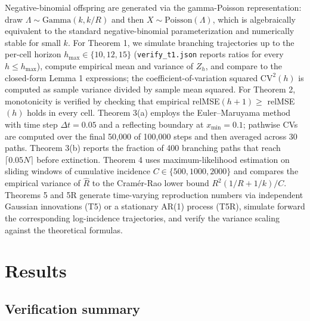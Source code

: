 \documentclass[review]{elsarticle}
\theoremstyle{plain}
\theoremstyle{definition}
\begin{document}
Negative-binomial offspring are generated via the gamma-Poisson representation: draw $\Lambda \sim \text{Gamma}(k, k/R)$ and then $X \sim \text{Poisson}(\Lambda)$, which is algebraically equivalent to the standard negative-binomial parameterization and numerically stable for small $k$. For Theorem 1, we simulate branching trajectories up to the per-cell horizon $h_{\max} \in \{10, 12, 15\}$ (\texttt{verify\_t1.json} reports ratios for every $h \le h_{\max}$), compute empirical mean and variance of $Z_h$, and compare to the closed-form Lemma 1 expressions; the coefficient-of-variation squared $\text{CV}^2(h)$ is computed as sample variance divided by sample mean squared. For Theorem 2, monotonicity is verified by checking that empirical relMSE$(h+1) \geq$ relMSE$(h)$ holds in every cell. Theorem 3(a) employs the Euler--Maruyama method with time step $\Delta t=0.05$ and a reflecting boundary at $x_{\min}=0.1$; pathwise CVs are computed over the final 50,000 of 100,000 steps and then averaged across 30 paths. Theorem 3(b) reports the fraction of 400 branching paths that reach $\lceil0.05N\rceil$ before extinction. Theorem 4 uses maximum-likelihood estimation on sliding windows of cumulative incidence $C \in \{500, 1000, 2000\}$ and compares the empirical variance of $\hat{R}$ to the Cram\'er-Rao lower bound $R^2(1/R + 1/k)/C$. Theorems 5 and 5R generate time-varying reproduction numbers via independent Gaussian innovations (T5) or a stationary AR(1) process (T5R), simulate forward the corresponding log-incidence trajectories, and verify the variance scaling against the theoretical formulas.



\section{Results}
\subsection{Verification summary}
\end{document}
